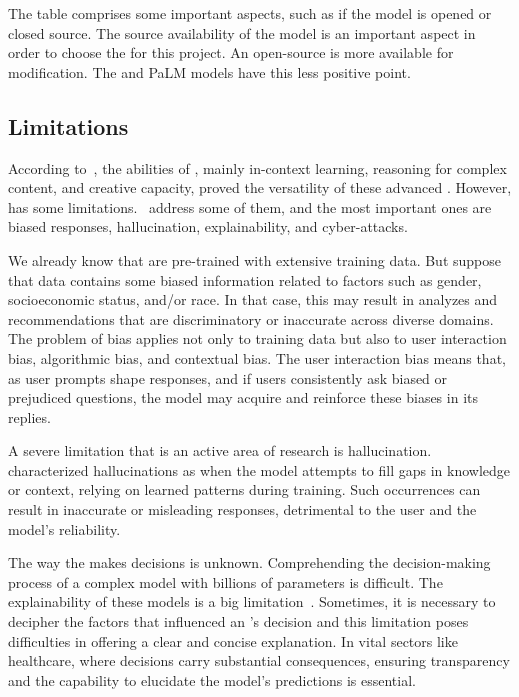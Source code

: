 The table comprises some important aspects, such as if the model is opened or closed source. The source availability of the model is an important aspect in order to choose the {\llm} for this project. An open-source {\llm} is more available for modification. The {\gpt} and PaLM models have this less positive point.



\subsection{Limitations}

According to~\citet{liu_prompting_nodate}, the abilities of {\llm}, mainly in-context learning, reasoning for complex content, and creative capacity, proved the versatility of these advanced {\lm}. However, {\llm} has some limitations.~\citet{hadi_LLM_2023} address some of them, and the most important ones are biased responses, hallucination, explainability, and cyber-attacks. 

We already know that {\llm} are pre-trained with extensive training data. But suppose that data contains some biased information related to factors such as gender, socioeconomic status, and/or race. In that case, this may result in analyzes and recommendations that are discriminatory or inaccurate across diverse domains. The problem of bias applies not only to training data but also to user interaction bias, algorithmic bias, and contextual bias. The user interaction bias means that, as user prompts shape responses, and if users consistently ask biased or prejudiced questions, the model may acquire and reinforce these biases in its replies.

A severe limitation that is an active area of research is hallucination.~\citet{church_emerging_2023} characterized {\llm} hallucinations as when the model attempts to fill gaps in knowledge or context, relying on learned patterns during training. Such occurrences can result in inaccurate or misleading responses, detrimental to the user and the model's reliability.

The way the {\llm} makes decisions is unknown. Comprehending the decision-making process of a complex model with billions of parameters is difficult. The explainability of these models is a big limitation~\cite{hadi_LLM_2023}. Sometimes, it is necessary to decipher the factors that influenced an {\llm}'s decision and this limitation poses difficulties in offering a clear and concise explanation. In vital sectors like healthcare, where decisions carry substantial consequences, ensuring transparency and the capability to elucidate the model's predictions is essential.


